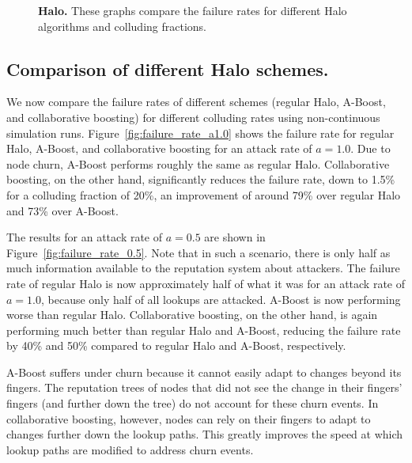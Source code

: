 \begin{figure}[t]
  \centering {}
\caption{{\bf Halo.} These graphs compare the failure rates
    for different Halo algorithms and colluding fractions.}
  \label{fig:failure_rate}
\end{figure}

\subsection{Comparison of different Halo schemes.}
\label{sec:eval-schemes}

We now compare the failure rates of different schemes (regular Halo,
A-Boost, and collaborative boosting) for different colluding rates using
non-continuous simulation runs. Figure~\ref{fig:failure_rate_a1.0} shows
the failure rate for regular Halo, A-Boost, and collaborative boosting
for an attack rate of $a=1.0$. Due to node churn, A-Boost performs
roughly the same as regular Halo.
Collaborative boosting, on the other hand, significantly reduces the
failure rate, down to 1.5\% for a colluding fraction of 20\%, an
improvement of around 79\% over regular Halo and 73\% over A-Boost.


The results for an attack rate of $a=0.5$ are shown in
Figure~\ref{fig:failure_rate_0.5}. Note that in such a scenario, there
is only half as much information available to the reputation system
about attackers. The failure rate of regular Halo is now approximately
half of what it was for an attack rate of $a=1.0$, because only half of
all lookups are attacked. A-Boost is now performing worse than regular
Halo. Collaborative boosting, on the other hand, is again performing
much better than regular Halo and A-Boost, reducing the failure rate by
40\% and 50\% compared to regular Halo and A-Boost, respectively.






A-Boost suffers under churn because it cannot easily adapt to changes
beyond its fingers. The reputation trees of nodes that did not see the
change in their fingers' fingers (and further down the tree) do not
account for these churn events.
In collaborative boosting, however, nodes can rely on their fingers to
adapt to changes further down the lookup paths. This greatly improves
the speed at which lookup paths are modified to address churn events.




